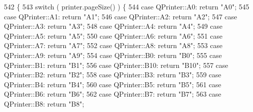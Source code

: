 \begin{DoxyCode}
542 \{
543     \textcolor{keywordflow}{switch} ( printer.pageSize() ) \{
544     \textcolor{keywordflow}{case} QPrinter::A0:         \textcolor{keywordflow}{return} \textcolor{stringliteral}{"A0"};
545     \textcolor{keywordflow}{case} QPrinter::A1:         \textcolor{keywordflow}{return} \textcolor{stringliteral}{"A1"};
546     \textcolor{keywordflow}{case} QPrinter::A2:         \textcolor{keywordflow}{return} \textcolor{stringliteral}{"A2"};
547     \textcolor{keywordflow}{case} QPrinter::A3:         \textcolor{keywordflow}{return} \textcolor{stringliteral}{"A3"};
548     \textcolor{keywordflow}{case} QPrinter::A4:         \textcolor{keywordflow}{return} \textcolor{stringliteral}{"A4"};
549     \textcolor{keywordflow}{case} QPrinter::A5:         \textcolor{keywordflow}{return} \textcolor{stringliteral}{"A5"};
550     \textcolor{keywordflow}{case} QPrinter::A6:         \textcolor{keywordflow}{return} \textcolor{stringliteral}{"A6"};
551     \textcolor{keywordflow}{case} QPrinter::A7:         \textcolor{keywordflow}{return} \textcolor{stringliteral}{"A7"};
552     \textcolor{keywordflow}{case} QPrinter::A8:         \textcolor{keywordflow}{return} \textcolor{stringliteral}{"A8"};
553     \textcolor{keywordflow}{case} QPrinter::A9:         \textcolor{keywordflow}{return} \textcolor{stringliteral}{"A9"};
554     \textcolor{keywordflow}{case} QPrinter::B0:         \textcolor{keywordflow}{return} \textcolor{stringliteral}{"B0"};
555     \textcolor{keywordflow}{case} QPrinter::B1:         \textcolor{keywordflow}{return} \textcolor{stringliteral}{"B1"};
556     \textcolor{keywordflow}{case} QPrinter::B10:        \textcolor{keywordflow}{return} \textcolor{stringliteral}{"B10"};
557     \textcolor{keywordflow}{case} QPrinter::B2:         \textcolor{keywordflow}{return} \textcolor{stringliteral}{"B2"};
558     \textcolor{keywordflow}{case} QPrinter::B3:         \textcolor{keywordflow}{return} \textcolor{stringliteral}{"B3"};
559     \textcolor{keywordflow}{case} QPrinter::B4:         \textcolor{keywordflow}{return} \textcolor{stringliteral}{"B4"};
560     \textcolor{keywordflow}{case} QPrinter::B5:         \textcolor{keywordflow}{return} \textcolor{stringliteral}{"B5"};
561     \textcolor{keywordflow}{case} QPrinter::B6:         \textcolor{keywordflow}{return} \textcolor{stringliteral}{"B6"};
562     \textcolor{keywordflow}{case} QPrinter::B7:         \textcolor{keywordflow}{return} \textcolor{stringliteral}{"B7"};
563     \textcolor{keywordflow}{case} QPrinter::B8:         \textcolor{keywordflow}{return} \textcolor{stringliteral}{"B8"};

\end{DoxyCode}
